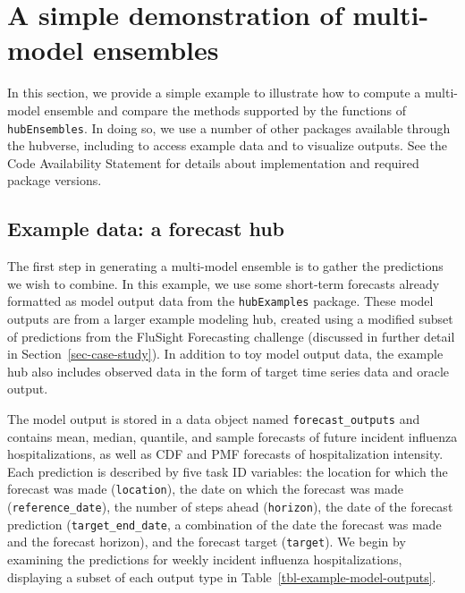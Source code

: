 \documentclass[
]{article}
\begin{document}
\section{A simple demonstration of multi-model
ensembles}\label{sec-simple-ex}

In this section, we provide a simple example to illustrate how to
compute a multi-model ensemble and compare the methods supported by the
functions of \texttt{hubEnsembles}. In doing so, we use a number of
other packages available through the hubverse, including to access
example data and to visualize outputs. See the Code Availability
Statement for details about implementation and required package
versions.

\subsection{Example data: a forecast
hub}\label{example-data-a-forecast-hub}

The first step in generating a multi-model ensemble is to gather the
predictions we wish to combine. In this example, we use some short-term
forecasts already formatted as model output data from the
\texttt{hubExamples} package. These model outputs are from a larger
example modeling hub, created using a modified subset of predictions
from the FluSight Forecasting challenge (discussed in further detail in
Section~\ref{sec-case-study}). In addition to toy model output data, the
example hub also includes observed data in the form of target time
series data and oracle output.

The model output is stored in a data object named
\texttt{forecast\_outputs} and contains mean, median, quantile, and
sample forecasts of future incident influenza hospitalizations, as well
as CDF and PMF forecasts of hospitalization intensity. Each prediction
is described by five task ID variables: the location for which the
forecast was made (\texttt{location}), the date on which the forecast
was made (\texttt{reference\_date}), the number of steps ahead
(\texttt{horizon}), the date of the forecast prediction
(\texttt{target\_end\_date}, a combination of the date the forecast was
made and the forecast horizon), and the forecast target
(\texttt{target}). We begin by examining the predictions for weekly
incident influenza hospitalizations, displaying a subset of each output
type in Table~\ref{tbl-example-model-outputs}.
\end{document}
